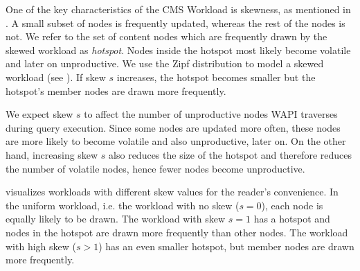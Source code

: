 \documentclass[abstracton,12pt]{scrartcl}
\theoremstyle{definition}
\begin{document}
\label{sec:skew}

One of the key characteristics of the CMS Workload is skewness, as mentioned in 
. A small subset of nodes is frequently updated,
whereas the rest of the nodes is not. We refer to the set of content nodes
which are frequently drawn by the skewed workload as \textit{hotspot}.
Nodes inside the hotspot most likely become volatile and later on unproductive.
We use the Zipf distribution to model a skewed workload (see ).
If skew $s$ increases, the hotspot becomes smaller 
but the hotspot's member nodes are drawn more frequently.


We expect skew $s$ to affect the number of unproductive nodes WAPI traverses during
query execution. Since some nodes are updated more often, these nodes are more likely
to become volatile
and also unproductive, later on. On the other hand, increasing skew $s$ also reduces
the size of the hotspot and therefore reduces
the number of volatile nodes, hence fewer nodes become unproductive.

 visualizes workloads with different skew values for the
reader's convenience. In the uniform workload, i.e. the workload with no skew ($s=0$),
each node is equally likely to be drawn. The workload with skew $s=1$ has a hotspot
and nodes in the hotspot are drawn more frequently than other nodes. The workload
with high skew ($s>1$) has an even smaller hotspot, but member nodes are drawn more frequently.

\end{document}
